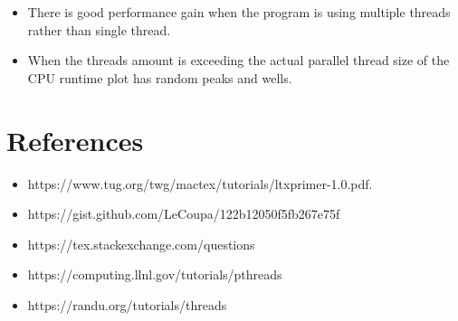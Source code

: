 \documentclass[12pt, a4paper]{article}
\begin{document}
	\begin{itemize}

		\item There is good performance gain when the program is using multiple threads rather than single thread.

		\item When the threads amount is exceeding the actual parallel thread size of the CPU runtime plot has random peaks and wells.


	\end{itemize}

	\newpage


	\section{References}

	\begin{itemize}
	  \item https://www.tug.org/twg/mactex/tutorials/ltxprimer-1.0.pdf.
	  \item https://gist.github.com/LeCoupa/122b12050f5fb267e75f
	  \item https://tex.stackexchange.com/questions
	  \item https://computing.llnl.gov/tutorials/pthreads
	  \item https://randu.org/tutorials/threads
	\end{itemize}
\end{document}
